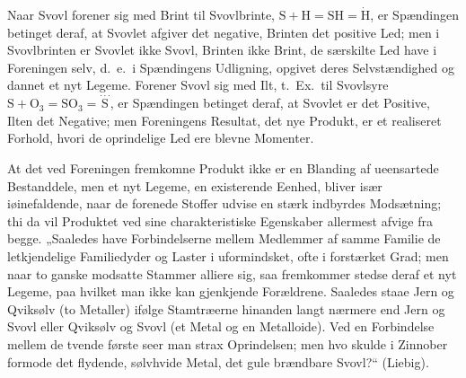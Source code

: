 \documentclass[12pt,a4paper]{book}
\begin{document}
Naar Svovl forener sig med Brint til Svovlbrinte,
$\mathrm{S} + \mathrm{H} = \mathrm{SH} = \dot{\mathrm{H}}$,
er Spændingen betinget deraf, at
Svovlet afgiver det negative, Brinten det positive Led; men
i Svovlbrinten er Svovlet ikke Svovl, Brinten ikke Brint,
de særskilte Led have i Foreningen selv, d.\ e.\ i Spændingens
Udligning, opgivet deres Selvstændighed og dannet et nyt
Legeme. Forener Svovl sig med Ilt, t.\ Ex.\ til Svovlsyre
$\mathrm{S} + \mathrm{O}_3 = \mathrm{SO}_3 =
\stackrel{\cdot\cdot\cdot}{\mathrm{S}}$, er Spændingen betinget
deraf, at Svovlet er det Positive, Ilten det Negative; men Foreningens
Resultat, det nye Produkt, er et realiseret Forhold, hvori de
oprindelige Led ere blevne Momenter.

At det ved Foreningen fremkomne Produkt ikke er en
Blanding af ueensartede Bestanddele, men et nyt Legeme, en
existerende Eenhed, bliver især iøinefaldende, naar de forenede
Stoffer udvise en stærk indbyrdes Modsætning; thi da vil
Produktet ved sine charakteristiske Egenskaber allermest afvige
fra begge. „Saaledes have Forbindelserne mellem Medlemmer
af samme Familie de letkjendelige Familiedyder og Laster i
uformindsket, ofte i forstærket Grad; men naar to ganske
modsatte Stammer alliere sig, saa fremkommer stedse deraf et
nyt Legeme, paa hvilket man ikke kan gjenkjende Forældrene.
Saaledes staae Jern og Qviksølv (to Metaller) ifølge Stamtræerne
hinanden langt nærmere end Jern og Svovl eller
Qviksølv og Svovl (et Metal og en Metalloide). Ved en
Forbindelse mellem de tvende første seer man strax Oprindelsen;
men hvo skulde i Zinnober formode det flydende, sølvhvide
Metal, det gule brændbare Svovl?“ (Liebig).
\end{document}
